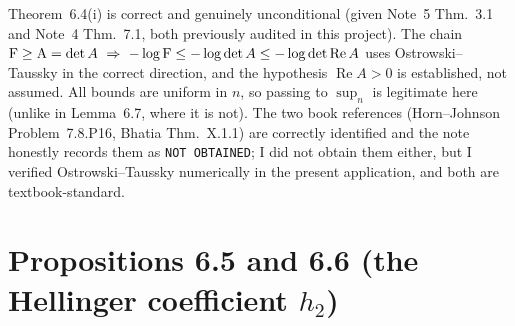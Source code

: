 \documentclass[11pt]{article}
\newcommand{\Hell}{\operatorname{A}}
\theoremstyle{definition}\newtheorem{problem}[theorem]{Problem}
\begin{document}
\begin{verdictok}
Theorem~6.4(i) is correct and genuinely unconditional (given Note~5 Thm.~3.1 and Note~4 Thm.~7.1,
both previously audited in this project).  The chain
\(\Fid\ge\Hell=\det A\ \Rightarrow\ -\log\Fid\le-\log\det A\le-\log\det\operatorname{Re}A\)
uses Ostrowski--Taussky in the correct direction, and the hypothesis \(\operatorname{Re}A>0\) is
established, not assumed.  All bounds are uniform in \(n\), so passing to \(\sup_n\) is legitimate
here (unlike in Lemma~6.7, where it is not).  The two book references
(Horn--Johnson Problem~7.8.P16, Bhatia Thm.~X.1.1) are correctly identified and the note honestly
records them as \texttt{NOT OBTAINED}; I did not obtain them either, but I verified
Ostrowski--Taussky numerically in the present application, and both are textbook-standard.
\end{verdictok}

\section{Propositions 6.5 and 6.6 (the Hellinger coefficient \(h_2\))}\label{sec:h2}
\end{document}
